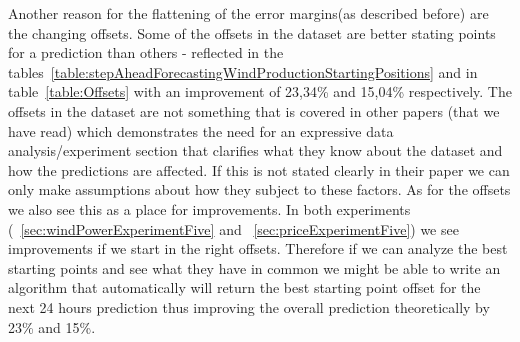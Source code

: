 Another reason for the flattening of the error margins(as described before) are the changing offsets. Some of the offsets in the dataset are better stating points for a prediction than others - reflected in the tables~\ref{table:stepAheadForecastingWindProductionStartingPositions} and in table~\ref{table:Offsets} with an improvement of 23,34\% and 15,04\% respectively. The offsets in the dataset are not something that is covered in other papers (that we have read) which demonstrates the need for an expressive data analysis/experiment section that clarifies what they know about the dataset and how the predictions are affected. If this is not stated clearly in their paper we can only make assumptions about how they subject to these factors. As for the offsets we also see this as a place for improvements. In both experiments (~\ref{sec:windPowerExperimentFive} and ~\ref{sec:priceExperimentFive}) we see improvements if we start in the right offsets. Therefore if we can analyze the best starting points and see what they have in common we might be able to write an algorithm that automatically will return the best starting point offset for the next 24 hours prediction thus improving the overall prediction theoretically by 23\% and 15\%.

